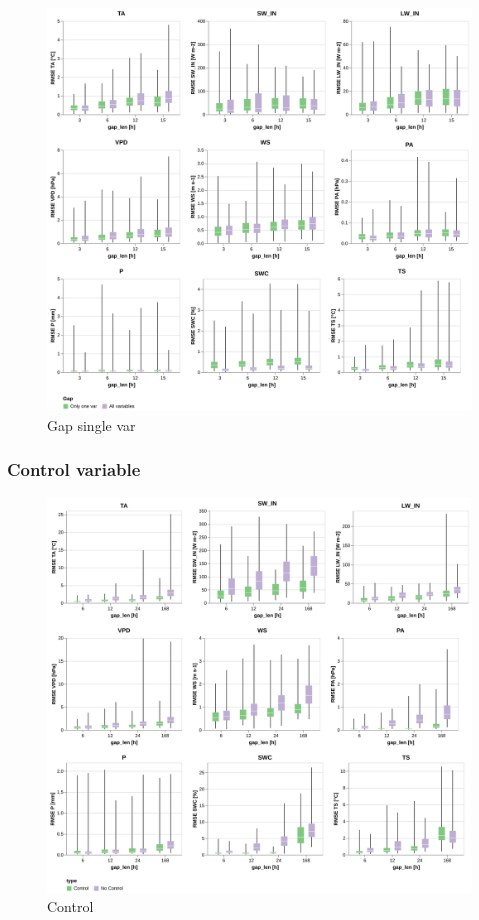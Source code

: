 \documentclass{article}
\newcommand{\imgwidth}{6in}
\begin{document}
\begin{figure}
\centerline{\includegraphics[width=\imgwidth]{gap_single_var}}
\caption{Gap single var}
\label{fig:gap_single_var}
\end{figure}

\subsubsection{Control variable}



\begin{figure}
\centerline{\includegraphics[width=\imgwidth]{images/use_control.png}}
\caption{Control}
\label{fig:control}
\end{figure}
\end{document}
